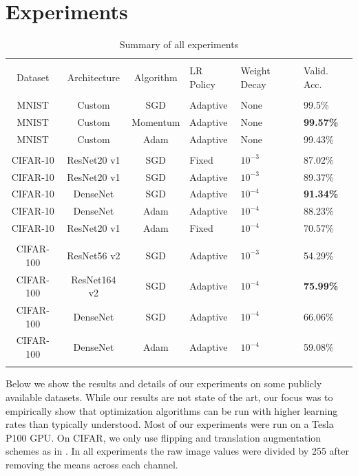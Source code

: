 \documentclass{article}
\begin{document}
\section{Experiments}
\begin{table}
    \centering
    \caption{Summary of all experiments}
    \begin{tabularx}{\textwidth}{cccYYY}
        \toprule \\
        Dataset & Architecture & Algorithm & LR Policy & Weight Decay & Valid. Acc. \\
        \midrule \\
        MNIST & Custom & SGD & Adaptive & None & 99.5\% \\
        MNIST & Custom & Momentum & Adaptive & None & \textbf{99.57\%} \\
        MNIST & Custom & Adam & Adaptive & None & 99.43\% \\
        \midrule \\
        CIFAR-10 & ResNet20 v1 & SGD & Fixed & $10^{-3}$ & 87.02\% \\
        CIFAR-10 & ResNet20 v1 & SGD & Adaptive & $10^{-3}$ & 89.37\% \\
        CIFAR-10 & DenseNet & SGD & Adaptive & $10^{-4}$ & \textbf{91.34\%} \\
        CIFAR-10 & DenseNet & Adam & Adaptive & $10^{-4}$ & 88.23\% \\
        CIFAR-10 & ResNet20 v1 & Adam & Fixed & $10^{-4}$ & 70.57\% \\
        \midrule \\
        CIFAR-100 & ResNet56 v2 & SGD & Adaptive & $10^{-3}$ & 54.29\% \\
        CIFAR-100 & ResNet164 v2 & SGD & Adaptive & $10^{-4}$ & \textbf{75.99\%} \\
        CIFAR-100 & DenseNet & SGD & Adaptive & $10^{-4}$ & 66.06\% \\
        CIFAR-100 & DenseNet & Adam & Adaptive & $10^{-4}$ & 59.08\% \\
        \bottomrule \\
    \end{tabularx}
    \label{tab:exp:summary}
\end{table}

Below we show the results and details of our experiments on some publicly available datasets. While our results are not state of the art, our focus was to empirically show that optimization algorithms can be run with higher learning rates than typically understood. Most of our experiments were run on a Tesla P100 GPU. On CIFAR, we only use flipping and translation augmentation schemes as in \cite{he2016deep}. In all experiments the raw image values were divided by 255 after removing the means across each channel.
\end{document}
